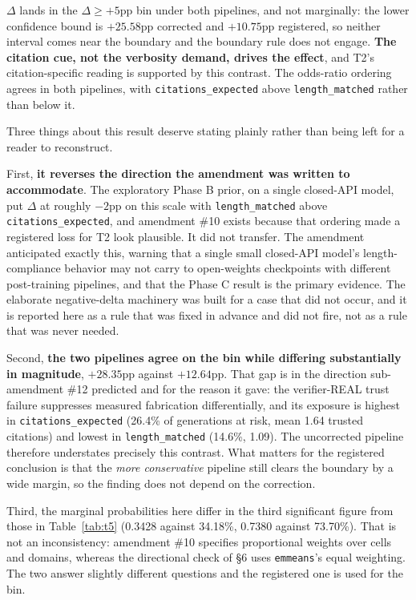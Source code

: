 $\Delta$ lands in the $\Delta \geq +5$pp bin under both pipelines, and not
marginally: the lower confidence bound is $+25.58$pp corrected and $+10.75$pp
registered, so neither interval comes near the boundary and the boundary rule
does not engage. \textbf{The citation cue, not the verbosity demand, drives the
effect}, and T2's citation-specific reading is supported by this contrast. The
odds-ratio ordering agrees in both pipelines, with
\texttt{citations\_expected} above \texttt{length\_matched} rather than below it.

Three things about this result deserve stating plainly rather than being left for
a reader to reconstruct.

First, \textbf{it reverses the direction the amendment was written to
accommodate}. The exploratory Phase B prior, on a single closed-API model, put
$\Delta$ at roughly $-2$pp on this scale with \texttt{length\_matched} above
\texttt{citations\_expected}, and amendment \#10 exists because that ordering
made a registered loss for T2 look plausible. It did not transfer. The amendment
anticipated exactly this, warning that a single small closed-API model's
length-compliance behavior may not carry to open-weights checkpoints with
different post-training pipelines, and that the Phase C result is the primary
evidence. The elaborate negative-delta machinery was built for a case that did
not occur, and it is reported here as a rule that was fixed in advance and did
not fire, not as a rule that was never needed.

Second, \textbf{the two pipelines agree on the bin while differing substantially
in magnitude}, $+28.35$pp against $+12.64$pp. That gap is in the direction
sub-amendment \#12 predicted and for the reason it gave: the verifier-REAL trust
failure suppresses measured fabrication differentially, and its exposure is
highest in \texttt{citations\_expected} (26.4\% of generations at risk, mean 1.64
trusted citations) and lowest in \texttt{length\_matched} (14.6\%, 1.09). The
uncorrected pipeline therefore understates precisely this contrast. What matters
for the registered conclusion is that the \emph{more conservative} pipeline still
clears the boundary by a wide margin, so the finding does not depend on the
correction.

Third, the marginal probabilities here differ in the third significant figure
from those in Table~\ref{tab:t5} (0.3428 against 34.18\%, 0.7380 against
73.70\%). That is not an inconsistency: amendment \#10 specifies proportional
weights over cells and domains, whereas the directional check of §6 uses
\texttt{emmeans}'s equal weighting. The two answer slightly different questions
and the registered one is used for the bin.

